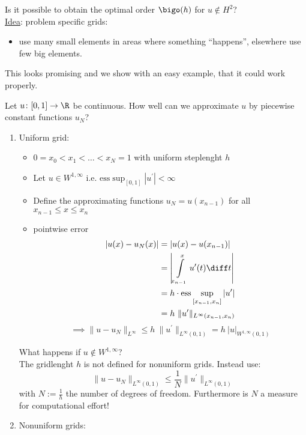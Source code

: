 Is it possible to obtain the optimal order $\bigo(h)$ for $u \not \in H^2$?\\
\underline{Idea}: problem specific grids:
\begin{itemize}
  \item use many small elements in areas where something \enquote{happens}, elsewhere use few big elements.
\end{itemize}
This looks promising and we show with an easy example, that it could work properly.
\begin{example}
	Let $u\colon [0,1] \to \R$ be continuous. How well can we approximate $u$ by piecewise constant functions $u_{N}$?
	\begin{enumerate}[label = \Roman*)]
		\item Uniform grid:
			\begin{itemize}
				\item $0 = x_{0} < x_{1}< \dots < x_{N} = 1$ with uniform steplenght $h$
				\item Let $u \in W^{1,\infty}$ i.e. $\text{ess}\sup_{[0,1]} | u^\prime|< \infty$
				\item Define the approximating functions $u_{N}=u(x_{n-1})$ for all $x_{n-1}\leq x \leq x_{n}$
				\item pointwise error
					\begin{align*}
						|u(x) - u_{N}(x) | &= | u(x) - u(x_{n-1})|\\
										   &= \left| \int\limits_{x_{n-1}}^{x} u^\prime(t) \diff t \right|\\
										   &= h\cdot \text{ess}\sup_{[x_{n-1},x_{n}]}|u^\prime | \\
										   &= h\ \|u^\prime\|_{L^\infty(x_{n-1},x_{n})}
					\end{align*}
					\begin{equation*}
						\implies\|u -u_{N}\|_{L^\infty} \leq h \ \|u^\prime\|_{L^\infty(0,1)}= h \ |u|_{W^{1,\infty}(0,1)}
				\end{equation*}
			\end{itemize}
			What happens if $u \not \in W^{1,\infty}$?\\
			The gridlenght $h$ is not defined for nonuniform grids. Instead use:
			\begin{equation*}
				\|u-u_{N}\|_{L^{\infty}(0,1)}  \leq \frac{1}{N} \|u^\prime\|_{L^\infty(0,1)}
			\end{equation*}
			with $N := \frac{1}{h}$ the number of degrees of freedom. Furthermore is $N$ a measure for computational effort!
		\item Nonuniform grids:\\

\end{enumerate}
\end{example}
